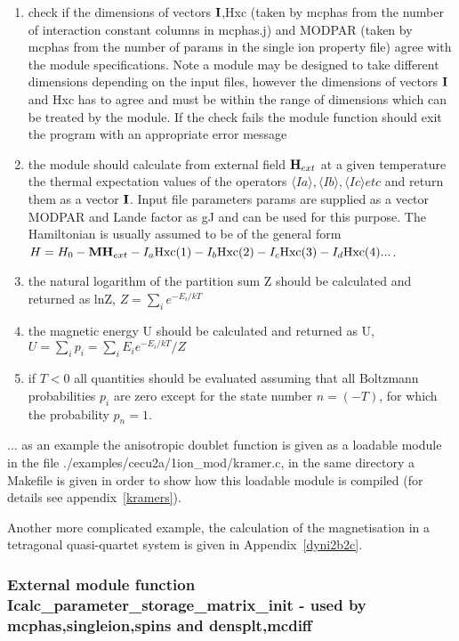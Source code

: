 \begin{enumerate}
\item check if the dimensions of vectors ${\mathbf I}$,Hxc (taken by {\prg mcphas} from the number of 
interaction constant columns in {\prg mcphas.j})
 and MODPAR (taken by {\prg mcphas} from the number of params in the single ion property
file) agree with the module specifications. Note a module may be designed to 
take different dimensions depending on the input files, however the dimensions
of vectors  ${\mathbf I}$ and Hxc has to agree and must be within the range of dimensions which
can be treated by the module. If the check fails the module function should exit the
program with an appropriate error message
\item the module should calculate from external field $\mathbf H_{ext}$ at a given temperature the 
thermal expectation values of the operators $\langle Ia\rangle, \langle Ib\rangle,\langle Ic\rangle etc$ 
and return them as
a vector $\mathbf I$. Input file parameters params are supplied as a vector MODPAR and
Lande factor as gJ and  can be used for this purpose. The Hamiltonian
is usually assumed to be of the general form
 $H=H_0- \mathbf M \mathbf H_{ext} - I_a {\rm Hxc}(1) -I_b {\rm Hxc}(2) -I_c {\rm Hxc}(3) 
-I_d {\rm Hxc}(4) ...$.
\item the natural logarithm of the partition sum Z should be calculated and returned as lnZ,
$Z=\sum_i e^{-E_i/kT}$
\item the magnetic energy U should be calculated and returned as U, $U=\sum_i p_i=\sum_i E_i e^{-E_i/kT}/Z$
\item if $T<0$ all quantities should be evaluated assuming that all Boltzmann probabilities $p_i$
 are zero except for the state number $n=(-T)$, for which the probability $p_n=1$.
\end{enumerate}

... as an example the anisotropic doublet function is given as a
loadable module in the file {\prg ./examples/cecu2a/1ion\_mod/kramer.c}, in the same
directory a Makefile is given in order to show how this loadable
module is compiled (for details see appendix~\ref{kramers}).

Another more complicated example, the calculation of the magnetisation
in a tetragonal quasi-quartet system is given in Appendix~\ref{dyni2b2c}.

\subsubsection{External module function {\prg Icalc\_parameter\_storage\_matrix\_init} - used by {\prg %
mcphas},{\prg singleion},{\prg spins} and {\prg %
densplt},{\prg mcdiff}  }

